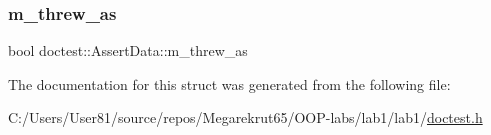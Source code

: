 \subsubsection{\texorpdfstring{m\+\_\+threw\+\_\+as}{m\_threw\_as}}
{\footnotesize\ttfamily bool doctest\+::\+Assert\+Data\+::m\+\_\+threw\+\_\+as}



The documentation for this struct was generated from the following file\+:\begin{DoxyCompactItemize}
\item 
C\+:/\+Users/\+User81/source/repos/\+Megarekrut65/\+O\+O\+P-\/labs/lab1/lab1/\mbox{\hyperlink{doctest_8h}{doctest.\+h}}\end{DoxyCompactItemize}
